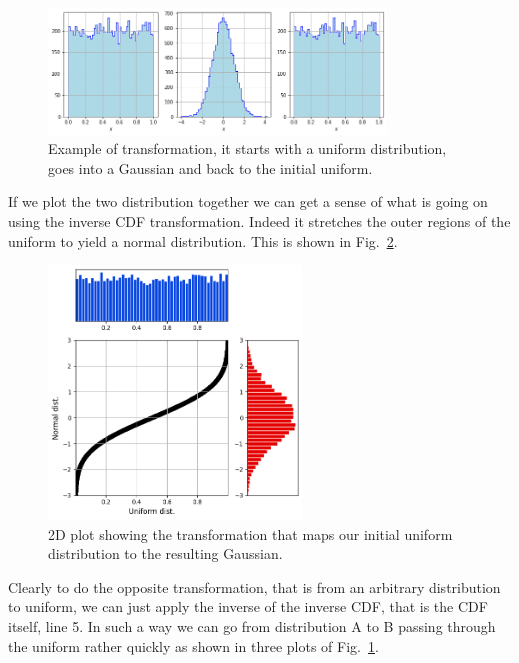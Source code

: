 \begin{figure}[htbp]
	\centering
	\includegraphics[width=0.8\textwidth]{figures/a_to_b_to_a}
	\caption{Example of transformation, it starts with a uniform distribution, goes into a Gaussian and back to the initial uniform.}
	\label{fig:a_to_b_to_a}
\end{figure}

If we plot the two distribution together we can get a sense of what is going on using the inverse CDF transformation. Indeed it stretches the outer regions of the uniform to yield a normal distribution. This is shown in Fig.~\ref{fig:uniform_to_gauss}. 
    
\begin{figure}[htbp]
\centering
\includegraphics[width=0.6\textwidth]{figures/uniform_to_gauss}
\caption{2D plot showing the transformation that maps our initial uniform distribution to the resulting Gaussian.}
\label{fig:uniform_to_gauss}
\end{figure}
    
Clearly to do the opposite transformation, that is from an arbitrary distribution to uniform, we can just apply the inverse of the inverse CDF, that is the CDF itself, line 5.
In such a way we can go from distribution A to B passing through the uniform rather quickly as shown in three plots of Fig.~\ref{fig:a_to_b_to_a}.

